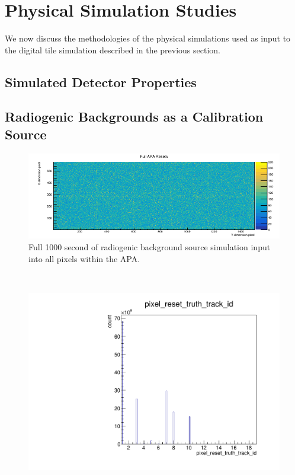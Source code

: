 \section{Physical Simulation Studies}

We now discuss the methodologies of the physical simulations used as input to the digital tile simulation described in the previous section.

\subsection{Simulated Detector Properties}


\subsection{Radiogenic Backgrounds as a Calibration Source}

\begin{figure}[]
\centering
\includegraphics[width=\textwidth]{images/fullApaResets.png}
\caption{Full 1000 second of radiogenic background source simulation input into all pixels within the APA.}
\end{figure}~\label{fig:background_simulation}

\begin{figure}[]
\centering
\includegraphics[width=\textwidth]{images/pixel_reset_truth_track_id.pdf}
\caption{}
\end{figure}~\label{fig:pixel_track_id}


